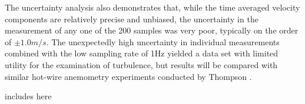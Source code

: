\documentclass[12pt]{report}
\begin{document}
The uncertainty analysis also demonstrates that, while the time averaged 
velocity components are relatively precise and unbiased, the uncertainty in the 
measurement of any one of the 200 samples was very poor, typically on the order 
of $\pm 1.0 m/s$. The unexpectedly high uncertainty in individual measurements 
combined with the low sampling rate of 1Hz yielded a data set with limited 
utility for the examination of turbulence, but results will be compared with 
similar hot-wire anemometry experiments conducted by Thompson 
\cite{thompson2016}.








\begin{thebibliography}{99}

\end{thebibliography}

\appendix
includes here

%	
%
\newpage

\vitapage
\end{document}
